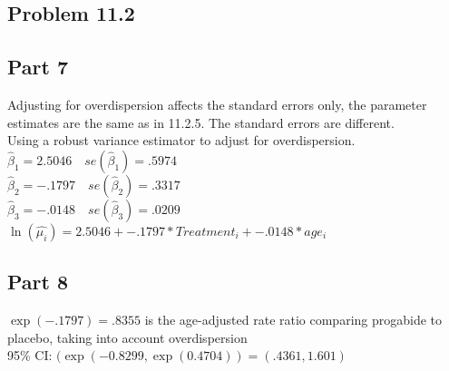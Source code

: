 \documentclass{article}
\newcommand{\hb}{\hat{\beta}}
\begin{document}
\begin{flushleft}
\section*{Problem 11.2}
\subsection*{Part 7}
Adjusting for overdispersion affects the standard errors only, the parameter estimates are the same as in 11.2.5. The standard errors are different.\\
Using a robust variance estimator to adjust for overdispersion.\\
$\hb_1=2.5046 \quad se(\hb_1)=.5974$\\
$\hb_2=-.1797 \quad se(\hb_2)=.3317$\\
$\hb_3=-.0148 \quad se(\hb_3)=.0209$\medbreak
$\ln(\hat{\mu_i})=2.5046+-.1797*Treatment_i+-.0148*age_i$ 
\subsection*{Part 8}
$\exp(-.1797)=.8355$ is the age-adjusted rate ratio comparing progabide to placebo, taking into account overdispersion\\
95\% CI: $(\exp(-0.8299,\exp(0.4704))=(.4361,1.601)$
\end{flushleft}
\end{document}
